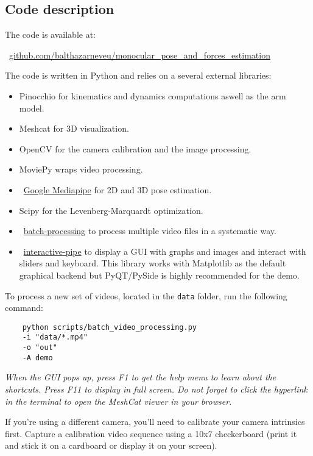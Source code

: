 \subsection{Code description}
\label{app:code}
The code is available at:

~\href{https://github.com/balthazarneveu/monocular_pose_and_forces_estimation}{github.com/balthazarneveu/monocular\_pose\_and\_forces\_estimation}

The code is written in Python and relies on a several external libraries:
\begin{itemize}
    \item Pinocchio for kinematics and dynamics computations aswell as the arm model.
    \item Meshcat for 3D visualization.
    \item OpenCV for the camera calibration and the image processing.
    \item MoviePy wraps video processing.
    \item ~\href{https://developers.google.com/mediapipe}{Google Mediapipe} for 2D and  3D pose estimation.
    \item Scipy for the Levenberg-Marquardt optimization.
    \item ~\href{https://github.com/emmcb/batch-processing}{batch-processing} to process multiple video files in a systematic way.
    \item ~\href{https://github.com/balthazarneveu/interactive_pipe}{interactive-pipe} to display a GUI with graphs and images and interact with sliders and keyboard.
    This library works with Matplotlib as the default graphical backend but PyQT/PySide is highly recommended for the demo.
\end{itemize}

To process a new set of videos, located in the \texttt{data} folder, run the following command:
\begin{verbatim}
    python scripts/batch_video_processing.py
    -i "data/*.mp4"
    -o "out"
    -A demo
\end{verbatim}
\textit{When the GUI pops up, press F1 to get the help menu to learn about the shortcuts. Press F11 to display in full screen.
Do not forget to click the hyperlink in the terminal to open the MeshCat viewer in your browser.}


If you're using a different camera, you'll need to calibrate your camera intrinsics first.
Capture a calibration video sequence using a 10x7 checkerboard (print it and stick it on a cardboard or display it on your screen).

